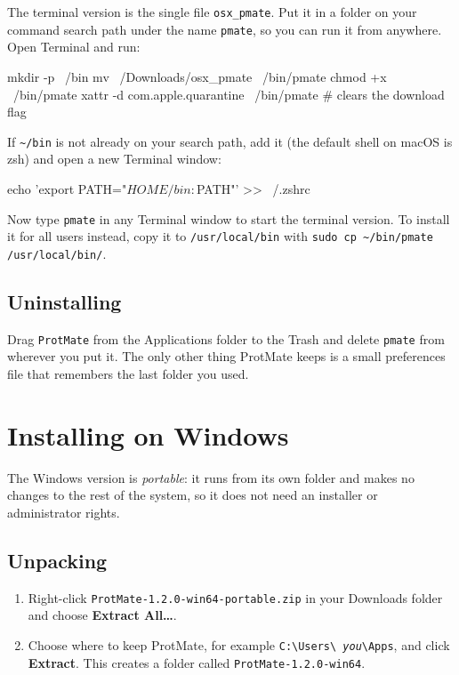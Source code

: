 \documentclass[11pt,a4paper,oneside]{report}
\newcommand{\pmversion}{1.2.0}
\newcommand{\cmd}[1]{\texttt{#1}}            %
\newcommand{\gui}[1]{\textsf{\textbf{#1}}}  %
\begin{document}
The terminal version is the single file \cmd{osx\_pmate}. Put it in a folder on your command
search path under the name \cmd{pmate}, so you can run it from anywhere. Open Terminal and run:

\begin{terminal}
mkdir -p ~/bin
mv ~/Downloads/osx_pmate ~/bin/pmate
chmod +x ~/bin/pmate
xattr -d com.apple.quarantine ~/bin/pmate   # clears the download flag
\end{terminal}

If \cmd{\textasciitilde/bin} is not already on your search path, add it (the default shell on
macOS is zsh) and open a new Terminal window:

\begin{terminal}
echo 'export PATH="$HOME/bin:$PATH"' >> ~/.zshrc
\end{terminal}

Now type \cmd{pmate} in any Terminal window to start the terminal version. To install it for all
users instead, copy it to \cmd{/usr/local/bin} with \cmd{sudo cp \textasciitilde/bin/pmate /usr/local/bin/}.

\section{Uninstalling}

Drag \cmd{ProtMate} from the Applications folder to the Trash and delete \cmd{pmate} from wherever
you put it. The only other thing ProtMate keeps is a small preferences file that remembers the last
folder you used.

\chapter{Installing on Windows}\label{ch:windows}

The Windows version is \emph{portable}: it runs from its own folder and makes no changes to the
rest of the system, so it does not need an installer or administrator rights.

\section{Unpacking}

\begin{enumerate}
  \item Right-click \cmd{ProtMate-\pmversion-win64-portable.zip} in your Downloads folder and
        choose \gui{Extract All\ldots}.
  \item Choose where to keep ProtMate, for example \cmd{C:\textbackslash Users\textbackslash
        \emph{you}\textbackslash Apps}, and click \gui{Extract}. This creates a folder called
        \cmd{ProtMate-\pmversion-win64}.
\end{enumerate}
\end{document}
